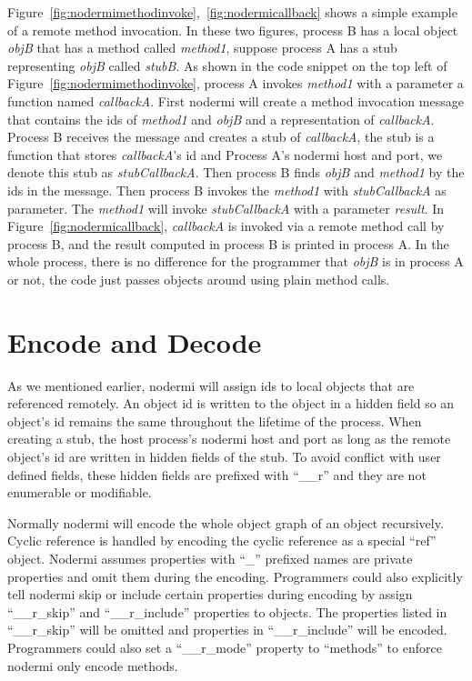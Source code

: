 Figure~\ref{fig:nodermimethodinvoke},~\ref{fig:nodermicallback} shows a simple example
of a remote method invocation.
In these two figures, process B has a local object \emph{objB} that has a method called \emph{method1},
suppose process A has a stub representing \emph{objB} called \emph{stubB}.
As shown in the code snippet on the top left of Figure~\ref{fig:nodermimethodinvoke},
process A invokes \emph{method1} with a parameter a function named \emph{callbackA}.
First nodermi will create a method invocation message that contains
the ids of \emph{method1} and \emph{objB} and a representation of \emph{callbackA}.
Process B receives the message and creates a stub of \emph{callbackA},
the stub is a function that stores \emph{callbackA}'s id and Process A's nodermi host and port,
we denote this stub as \emph{stubCallbackA}.
Then process B finds \emph{objB} and \emph{method1} by the ids in the message.
Then process B invokes the \emph{method1} with \emph{stubCallbackA} as parameter.
The \emph{method1} will invoke \emph{stubCallbackA} with a parameter \emph{result}.
In Figure~\ref{fig:nodermicallback}, \emph{callbackA} is invoked
via a remote method call by process B,
and the result computed in process B is printed in process A.
In the whole process, there is no difference for the programmer that \emph{objB}
is in process A or not, the code just passes objects around using plain method calls.



\section{Encode and Decode}
As we mentioned earlier, nodermi will assign ids to local
objects that are referenced remotely.
An object id is written to the object in a hidden field
so an object's id remains the same throughout the lifetime of the process.
When creating a stub,
the host process's nodermi host and port as long as the remote object's id
are written in hidden fields of the stub.
To avoid conflict with user defined fields, these hidden fields are prefixed
with ``\_\_r'' and they are not enumerable or modifiable.

Normally nodermi will encode the whole object graph of an object recursively.
Cyclic reference is handled by encoding the cyclic reference as
a special ``ref'' object.
Nodermi assumes properties with ``\_'' prefixed names are private
properties and omit them during the encoding.
Programmers could also explicitly tell nodermi skip or include
certain properties during encoding by assign
``\_\_r\_skip'' and ``\_\_r\_include'' properties to objects.
The properties listed in ``\_\_r\_skip'' will be omitted and
properties in ``\_\_r\_include'' will be encoded.
Programmers could also set a ``\_\_r\_mode'' property to ``methods''
to enforce nodermi only encode methods.

